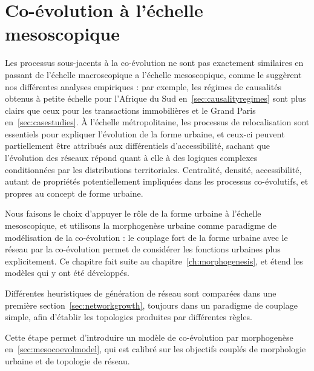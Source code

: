 

\chapter{Co-évolution à l'échelle mesoscopique}


\label{ch:mesocoevolution} 




Les processus sous-jacents à la co-évolution ne sont pas exactement similaires en passant de l'échelle macroscopique a l'échelle mesoscopique, comme le suggèrent nos différentes analyses empiriques : par exemple, les régimes de causalités obtenus à petite échelle pour l'Afrique du Sud en~\ref{sec:causalityregimes} sont plus clairs que ceux pour les transactions immobilières et le Grand Paris en~\ref{sec:casestudies}. À l'échelle métropolitaine, les processus de relocalisation sont essentiels pour expliquer l'évolution de la forme urbaine, et ceux-ci peuvent partiellement être attribués aux différentiels d'accessibilité, sachant que l'évolution des réseaux répond quant à elle à des logiques complexes conditionnées par les distributions territoriales. Centralité, densité, accessibilité, autant de propriétés potentiellement impliquées dans les processus co-évolutifs, et propres au concept de forme urbaine.


Nous faisons le choix d'appuyer le rôle de la forme urbaine à l'échelle mesoscopique, et utilisons la morphogenèse urbaine comme paradigme de modélisation de la co-évolution : le couplage fort de la forme urbaine avec le réseau par la co-évolution permet de considérer les fonctions urbaines plus explicitement. Ce chapitre fait suite au chapitre~\ref{ch:morphogenesis}, et étend les modèles qui y ont été développés.

Différentes heuristiques de génération de réseau sont comparées dans une première section~\ref{sec:networkgrowth}, toujours dans un paradigme de couplage simple, afin d'établir les topologies produites par différentes règles.

Cette étape permet d'introduire un modèle de co-évolution par morphogenèse en~\ref{sec:mesocoevolmodel}, qui est calibré sur les objectifs couplés de morphologie urbaine et de topologie de réseau.


